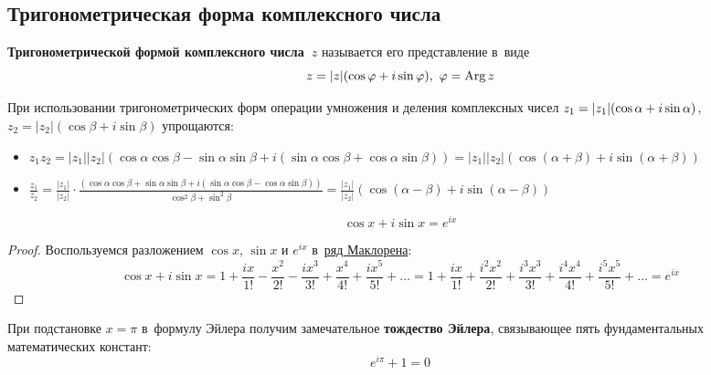 \subsection{Тригонометрическая форма комплексного числа}
\textbf{Тригонометрической формой комплексного числа~$z$} называется его представление в~виде
\begin{equation*}
z = |z|(\cos \varphi + i\sin \varphi), \ \varphi = \operatorname{Arg} z
\end{equation*}

При использовании тригонометрических форм операции умножения и деления комплексных чисел
$z_1 = |z_1| \* (\cos \alpha + i\sin \alpha)$, $z_2 = |z_2|(\cos \beta + i\sin \beta)$ упрощаются:
\begin{itemize}
	\item $\displaystyle z_1 z_2 = |z_1| |z_2|(\cos \alpha \cos \beta - \sin \alpha \sin \beta + i(\sin \alpha \cos \beta + \cos \alpha \sin \beta)) =
	|z_1| |z_2|(\cos (\alpha + \beta) + i\sin (\alpha + \beta))$
	
	\item $\displaystyle \frac{z_1}{z_2} = \frac{|z_1|}{|z_2|} \cdot
	\frac{(\cos \alpha \cos \beta + \sin \alpha \sin \beta + i(\sin \alpha \cos \beta - \cos \alpha \sin \beta))}
	{\cos^2 \beta + \sin^2 \beta} =
	\frac{|z_1|}{|z_2|} (\cos (\alpha - \beta) + i\sin (\alpha - \beta))$
\end{itemize}

\begin{theorem}
\label{eq:Euler's_formula}
\begin{equation*}
\cos x + i\sin x = e^{ix}
\end{equation*}
\end{theorem}
\begin{proof}
Воспользуемся разложением $\cos x$, $\sin x$ и $e^{ix}$ в~\hyperref[eq:Maclaurin_series]{ряд Маклорена}:
\begin{equation*}
\cos x + i\sin x = 1 + \frac{ix}{1!} - \frac{x^2}{2!} - \frac{ix^3}{3!} + \frac{x^4}{4!} + \frac{ix^5}{5!} + \ldots =
1 + \frac{ix}{1!} + \frac{i^2 x^2}{2!} + \frac{i^3 x^3}{3!} + \frac{i^4 x^4}{4!} + \frac{i^5 x^5}{5!} + \ldots = e^{ix}
\end{equation*}
\end{proof}

При подстановке $x = \pi$ в~формулу Эйлера получим замечательное \textbf{тождество Эйлера}, связывающее пять фундаментальных математических констант:
\begin{equation*}
e^{i\pi} + 1 = 0
\end{equation*}

